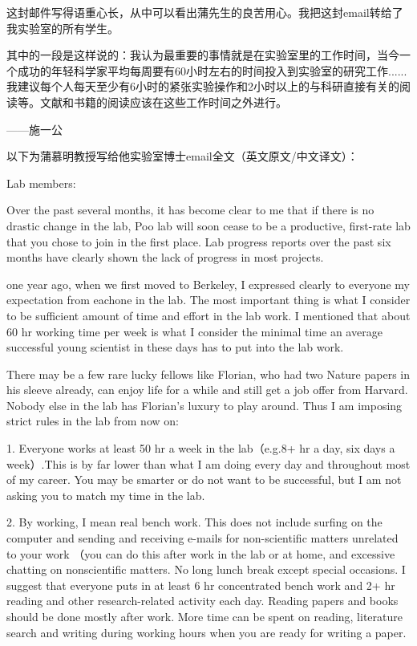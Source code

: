 这封邮件写得语重心长，从中可以看出蒲先生的良苦用心。我把这封email转给了我实验室的所有学生。

其中的一段是这样说的：我认为最重要的事情就是在实验室里的工作时间，当今一个成功的年轻科学家平均每周要有60小时左右的时间投入到实验室的研究工作......我建议每个人每天至少有6小时的紧张实验操作和2小时以上的与科研直接有关的阅读等。文献和书籍的阅读应该在这些工作时间之外进行。

——施一公

以下为蒲慕明教授写给他实验室博士email全文（英文原文/中文译文）：

Lab members:

Over the past several months, it has become clear to me that if there is no drastic change in the lab, Poo lab will soon cease to be a productive, first-rate lab that you chose to join in the first place. Lab progress reports over the past six months have clearly shown the lack of progress in most projects.

one year ago, when we first moved to Berkeley, I expressed clearly to everyone my expectation from eachone in the lab. The most important thing is what I consider to be sufficient amount of time and effort in the lab work. I mentioned that about 60 hr working time per week is what I consider the minimal time an average successful young scientist in these days has to put into the lab work.

There may be a few rare lucky fellows like Florian, who had two Nature papers in his sleeve already, can enjoy life for a while and still get a job offer from Harvard. Nobody else in the lab has Florian's luxury to play around. Thus I am imposing strict rules in the lab from now on:

1. Everyone works at least 50 hr a week in the lab（e.g.8+ hr a day, six days a week）.This is by far lower than what I am doing every day and throughout most of my career. You may be smarter or do not want to be successful, but I am not asking you to match my time in the lab.

2. By working, I mean real bench work. This does not include surfing on the computer and sending and receiving e-mails for non-scientific matters unrelated to your work （you can do this after work in the lab or at home, and excessive chatting on nonscientific matters. No long lunch break except special occasions. I suggest that everyone puts in at least 6 hr concentrated bench work and 2+ hr reading and other research-related activity each day. Reading papers and books should be done mostly after work. More time can be spent on reading, literature search and writing during working hours when you are ready for writing a paper.

